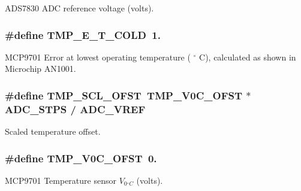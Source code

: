 A\-D\-S7830 A\-D\-C reference voltage (volts). \hypertarget{a00042_acc66f9f90ea4746679f5d26c834ddea5}{
\subsubsection[{T\-M\-P\-\_\-\-E\-\_\-\-T\-\_\-\-C\-O\-L\-D}]{\setlength{\rightskip}{0pt plus 5cm}\#define T\-M\-P\-\_\-\-E\-\_\-\-T\-\_\-\-C\-O\-L\-D~1.}}\label{a00042_acc66f9f90ea4746679f5d26c834ddea5}
M\-C\-P9701 Error at lowest operating temperature ( $ ^\circ$ C), calculated as shown in Microchip A\-N1001. \hypertarget{a00042_a0f910bb108922c8686a139977510af53}{
\subsubsection[{T\-M\-P\-\_\-\-S\-C\-L\-\_\-\-O\-F\-S\-T}]{\setlength{\rightskip}{0pt plus 5cm}\#define T\-M\-P\-\_\-\-S\-C\-L\-\_\-\-O\-F\-S\-T~{\bf T\-M\-P\-\_\-\-V0\-C\-\_\-\-O\-F\-S\-T} $\ast$ {\bf A\-D\-C\-\_\-\-S\-T\-P\-S} / {\bf A\-D\-C\-\_\-\-V\-R\-E\-F}}}\label{a00042_a0f910bb108922c8686a139977510af53}
Scaled temperature offset. \hypertarget{a00042_a6d41a70e126c748f2c99c3ff8228eb1b}{
\subsubsection[{T\-M\-P\-\_\-\-V0\-C\-\_\-\-O\-F\-S\-T}]{\setlength{\rightskip}{0pt plus 5cm}\#define T\-M\-P\-\_\-\-V0\-C\-\_\-\-O\-F\-S\-T~0.}}\label{a00042_a6d41a70e126c748f2c99c3ff8228eb1b}
M\-C\-P9701 Temperature sensor $ V_{0{^\circ}C}$ (volts). 

